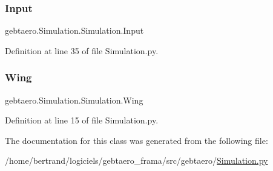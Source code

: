\subsubsection{\texorpdfstring{Input}{Input}}
{\footnotesize\ttfamily gebtaero.\+Simulation.\+Simulation.\+Input}



Definition at line 35 of file Simulation.\+py.

\mbox{\label{classgebtaero_1_1_simulation_1_1_simulation_a2900b07110293466d8ca5c75ef8e04f8}} 
\subsubsection{\texorpdfstring{Wing}{Wing}}
{\footnotesize\ttfamily gebtaero.\+Simulation.\+Simulation.\+Wing}



Definition at line 15 of file Simulation.\+py.



The documentation for this class was generated from the following file\+:\begin{DoxyCompactItemize}
\item 
/home/bertrand/logiciels/gebtaero\+\_\+frama/src/gebtaero/\hyperlink{_simulation_8py}{Simulation.\+py}\end{DoxyCompactItemize}
